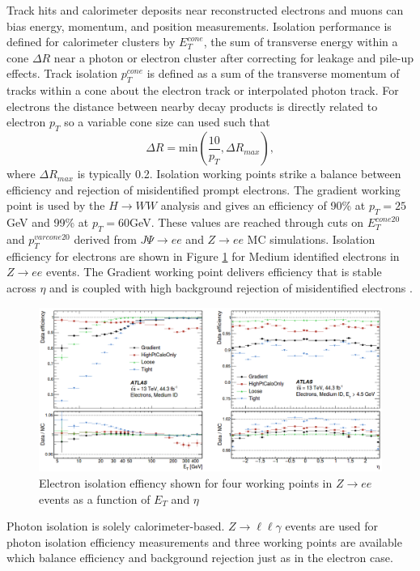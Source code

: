 Track hits and calorimeter deposits near reconstructed electrons and muons can bias energy, momentum, and position measurements. Isolation performance is defined for calorimeter clusters by $E_T^{cone}$, the sum of transverse energy within a cone $\Delta R$ near a photon or electron cluster after correcting for leakage and pile-up effects. Track isolation $p_T^{cone}$ is defined as a sum of the transverse momentum of tracks within a cone about the electron track or interpolated photon track. For electrons the distance between nearby decay products is directly related to electron $p_T$ so a variable cone size can used such that 
\begin{equation}
\Delta R = \text{min}(\frac{10}{p_T},\Delta R_{max}),
\end{equation}
where $\Delta R_{max}$ is typically 0.2. Isolation working points strike a balance between efficiency and rejection of misidentified prompt electrons. The gradient working point is used by the $H\rightarrow WW$ analysis and gives an efficiency of 90\% at $p_T = 25$GeV and 99\% at $p_T = 60$GeV. These values are reached through cuts on $E_T^{cone20}$ and $p_T^{varcone20}$ derived from $J\Psi\rightarrow ee$ and $Z\rightarrow ee$ MC simulations. Isolation efficiency for electrons are shown in Figure \ref{fig:ElectronIsoEff} for Medium identified electrons in $Z\rightarrow ee$ events. The Gradient working point delivers efficiency that is stable across $\eta$ and is coupled with high background rejection of misidentified electrons \cite{ElectronPhotonPerformance}.  

\begin{figure}[!h]
        \centering
    \includegraphics[width=.65\textwidth]{Pictures/ElectronIsoEff.png}
    \caption{ Electron isolation effiency shown for four working points in $Z\rightarrow ee$ events as a function of $E_T$ and $\eta$ \cite{ElectronPhotonPerformance}}
    \label{fig:ElectronIsoEff}
\end{figure}

Photon isolation is solely calorimeter-based. $Z\rightarrow \ell\ell\gamma$ events are used for photon isolation efficiency measurements and three working points are available which balance efficiency and background rejection just as in the electron case. 

